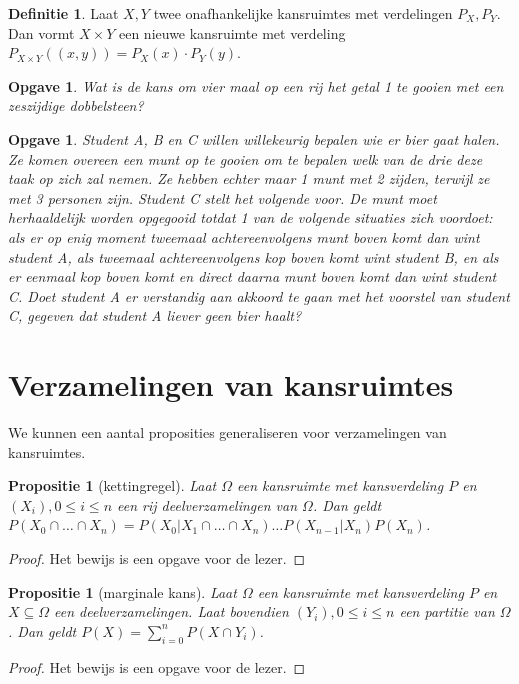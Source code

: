 \documentclass[a4paper]{book}
\newtheorem{proposition}[theorem]{Propositie}
\newtheorem{exercise}[theorem]{Opgave}
\theoremstyle{definition}
\newtheorem{definition}[theorem]{Definitie}
\begin{document}
\begin{definition}
    Laat $X,Y$ twee onafhankelijke kansruimtes met verdelingen $P_X,P_Y$.
    Dan vormt $X \times Y$ een nieuwe kansruimte met verdeling $P_{X \times Y}((x,y)) = P_X(x) \cdot P_Y(y)$.
\end{definition}

\begin{exercise}
Wat is de kans om vier maal op een rij het getal 1 te gooien met een zeszijdige dobbelsteen?
\end{exercise}

\begin{exercise}
Student A, B en C willen willekeurig bepalen wie er bier gaat halen.
Ze komen overeen een munt op te gooien om te bepalen welk van de drie deze taak op zich zal nemen.
Ze hebben echter maar 1 munt met 2 zijden, terwijl ze met 3 personen zijn. Student C stelt het volgende voor. De munt moet herhaaldelijk worden opgegooid
totdat 1 van de volgende situaties zich voordoet: als er op enig moment tweemaal achtereenvolgens munt boven komt dan wint student A, als tweemaal
achtereenvolgens kop boven komt wint student B, en als er eenmaal kop boven komt en direct daarna munt boven komt dan wint student C. Doet student A er
verstandig aan akkoord te gaan met het voorstel van student C, gegeven dat student A liever geen bier haalt?
\end{exercise}


\section{Verzamelingen van kansruimtes}
We kunnen een aantal proposities generaliseren voor verzamelingen van kansruimtes.

\begin{proposition}[kettingregel]
    Laat $\Omega$ een kansruimte met kansverdeling $P$ en $(X_i), 0 \leq i \leq n$ een rij deelverzamelingen van $\Omega$.
    Dan geldt $P(X_0 \cap \dots \cap X_n) = P(X_0|X_1 \cap \dots \cap X_n) \dots P(X_{n-1}|X_n)P(X_n)$.
\end{proposition}
\begin{proof}
    Het bewijs is een opgave voor de lezer.
\end{proof}

\begin{proposition}[marginale kans]
    Laat $\Omega$ een kansruimte met kansverdeling $P$ en $X \subseteq \Omega$ een deelverzamelingen.
    Laat bovendien $(Y_i), 0 \leq i \leq n$ een partitie van $\Omega$.
    Dan geldt $P(X) = \sum_{i=0}^n P(X \cap Y_i)$.
\end{proposition}
\begin{proof}
    Het bewijs is een opgave voor de lezer.
\end{proof}
\end{document}
